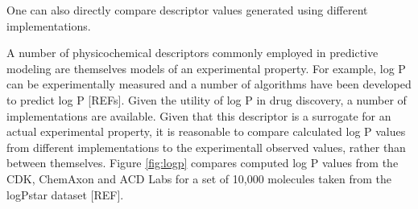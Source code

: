 \documentclass[letterpaper, 12pt]{article}
\begin{document}
One can also directly compare descriptor values generated using
different implementations. 

A number of physicochemical descriptors commonly employed in
predictive modeling are themselves models of an experimental
property. For example, log P can be experimentally measured and a
number of algorithms have been developed to predict log P
[REFs]. Given the utility of log P in drug discovery, a number of
implementations are available. Given that this descriptor is a
surrogate for an actual experimental property, it is reasonable to
compare calculated log P values from different implementations to the
experimentall observed values, rather than between themselves. Figure
\ref{fig:logp} compares computed log P values from the CDK, ChemAxon
and ACD Labs for a set of 10,000 molecules taken from the logPstar
dataset [REF].
\end{document}
